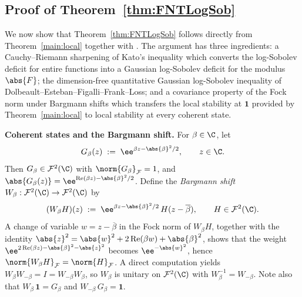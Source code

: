 %

\subsection{Proof of Theorem~\ref{thm:FNTLogSob}}\label{subsec:FNTproof}

We now show that Theorem~\ref{thm:FNTLogSob} follows directly from
Theorem~\ref{main:local} together with
\cite[Corollary~1.2]{DolbeaultEstebanFigalliFrankLoss2025}.  The argument
has three ingredients: a Cauchy--Riemann sharpening of Kato's inequality
which converts the log-Sobolev deficit for entire functions into a Gaussian
log-Sobolev deficit for the modulus~$\abs{F}$; the dimension-free
quantitative Gaussian log-Sobolev inequality of
Dolbeault--Esteban--Figalli--Frank--Loss; and a covariance property of the
Fock norm under Bargmann shifts which transfers the local stability at
$\mathbf{1}$ provided by Theorem~\ref{main:local} to local stability at every
coherent state.
\medskip

\noindent\textbf{Coherent states and the Bargmann shift.}\;
For $\beta \in \C$, let
\[
G_\beta(z) \;:=\; \ee^{\beta z - \abs{\beta}^2/2},
\qquad z \in \C.
\]
Then $G_\beta \in \mathcal{F}^2(\C)$ with $\norm{G_\beta}_{\mathcal{F}} = 1$,
and $\abs{G_\beta(z)}
= \ee^{\operatorname{Re}(\beta z) - \abs{\beta}^2/2}$.
Define the \emph{Bargmann shift}
$W_\beta : \mathcal{F}^2(\C) \to \mathcal{F}^2(\C)$ by
\[
(W_\beta H)(z)
\;:=\; \ee^{\beta z - \abs{\beta}^2/2}\, H(z - \overline{\beta}),
\qquad H \in \mathcal{F}^2(\C).
\]
A change of variable $w = z - \overline{\beta}$ in the Fock norm of $W_\beta H$,
together with the identity
$\abs{z}^2 = \abs{w}^2 + 2\operatorname{Re}(\beta w) + \abs{\beta}^2$,
shows that the weight
$\ee^{2 \operatorname{Re}(\beta z) - \abs{\beta}^2 - \abs{z}^2}$
becomes $\ee^{-\abs{w}^2}$, hence
$\norm{W_\beta H}_{\mathcal{F}} = \norm{H}_{\mathcal{F}}$.  A direct
computation yields $W_\beta W_{-\beta} = I = W_{-\beta} W_\beta$, so $W_\beta$
is unitary on $\mathcal{F}^2(\C)$ with $W_\beta^{-1} = W_{-\beta}$.
Note also that $W_\beta\, \mathbf{1} = G_\beta$ and
$W_{-\beta}\, G_\beta = \mathbf{1}$.

